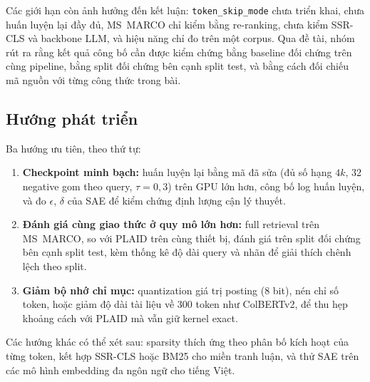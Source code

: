 \documentclass[a4paper,13pt]{extreport}
\theoremstyle{plain}
\newcommand{\ssr}{SSR}
\begin{document}
Các giới hạn còn ảnh hưởng đến kết luận: \texttt{token\_skip\_mode} chưa triển khai, chưa huấn luyện lại đầy đủ, MS~MARCO chỉ kiểm bằng re-ranking, chưa kiểm \ssr-CLS và backbone LLM, và hiệu năng chỉ đo trên một corpus. Qua đề tài, nhóm rút ra rằng kết quả công bố cần được kiểm chứng bằng baseline đối chứng trên cùng pipeline, bằng split đối chứng bên cạnh split test, và bằng cách đối chiếu mã nguồn với từng công thức trong bài.

\subsection{Hướng phát triển}
Ba hướng ưu tiên, theo thứ tự:
\begin{enumerate}[leftmargin=1.5cm]
  \item \textbf{Checkpoint minh bạch:} huấn luyện lại bằng mã đã sửa (đủ số hạng $4k$, 32 negative gom theo query, $\tau=0{,}3$) trên GPU lớn hơn, công bố log huấn luyện, và đo $\epsilon$, $\delta$ của SAE để kiểm chứng định lượng cận lý thuyết.
  \item \textbf{Đánh giá cùng giao thức ở quy mô lớn hơn:} full retrieval trên MS~MARCO, so với PLAID trên cùng thiết bị, đánh giá trên split đối chứng bên cạnh split test, kèm thống kê độ dài query và nhãn để giải thích chênh lệch theo split.
  \item \textbf{Giảm bộ nhớ chỉ mục:} quantization giá trị posting (8 bit), nén chỉ số token, hoặc giảm độ dài tài liệu về 300 token như ColBERTv2, để thu hẹp khoảng cách với PLAID mà vẫn giữ kernel exact.
\end{enumerate}
Các hướng khác có thể xét sau: sparsity thích ứng theo phân bố kích hoạt của từng token, kết hợp \ssr-CLS hoặc BM25 cho miền tranh luận, và thử SAE trên các mô hình embedding đa ngôn ngữ cho tiếng Việt.
\end{document}

